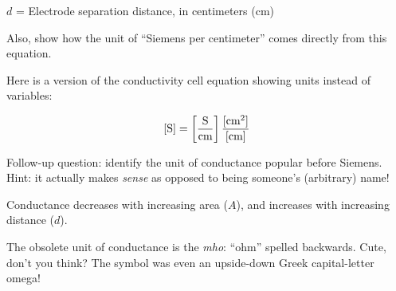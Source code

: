 $d$ = Electrode separation distance, in centimeters (cm)

\vskip 10pt

Also, show how the unit of ``Siemens per centimeter'' comes directly from this equation.







Here is a version of the conductivity cell equation showing units instead of variables:

$$[\hbox{S}] = \left[{\hbox{S} \over \hbox{cm}}\right]{[\hbox{cm}^2] \over [\hbox{cm}]}$$

\vskip 10pt

Follow-up question: identify the unit of conductance popular before Siemens.  Hint: it actually makes {\it sense} as opposed to being someone's (arbitrary) name!







Conductance decreases with increasing area ($A$), and increases with increasing distance ($d$).

\vskip 10pt

The obsolete unit of conductance is the {\it mho}: ``ohm'' spelled backwards.  Cute, don't you think?  The symbol was even an upside-down Greek capital-letter omega!




